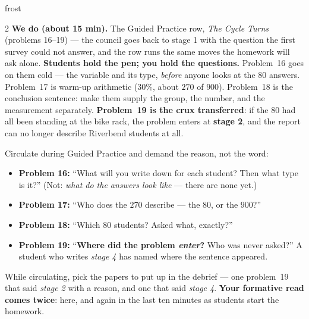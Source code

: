 \documentclass[10pt]{article}
\begin{document}
\begin{skillbox}{frost}
\begin{multicols}{2}
\columnbreak
\textbf{We do (about 15 min).} The Guided Practice row, \emph{The Cycle Turns} (problems
16--19) --- the council goes back to stage 1 with the question the first survey could not
answer, and the row runs the same moves the homework will ask alone.
\textbf{Students hold the pen; you hold the questions.} Problem~16 goes on them cold --- the
variable and its type, \emph{before} anyone looks at the $80$ answers. Problem~17 is warm-up
arithmetic ($30\%$, about $270$ of $900$). Problem~18 is the conclusion sentence: make them
supply the group, the number, and the measurement separately. \textbf{Problem~19 is the crux
transferred}: if the $80$ had all been standing at the bike rack, the problem enters at
\textbf{stage 2}, and the report can no longer describe Riverbend students at all.

Circulate during Guided Practice and demand the reason, not the word:
\begin{itemize}[leftmargin=1.1em, nosep]
  \item \textbf{Problem 16:} ``What will you write down for each student? Then what type is
        it?'' (Not: \emph{what do the answers look like} --- there are none yet.)
  \item \textbf{Problem 17:} ``Who does the $270$ describe --- the $80$, or the $900$?''
  \item \textbf{Problem 18:} ``Which $80$ students? Asked what, exactly?''
  \item \textbf{Problem 19:} ``\textbf{Where did the problem \emph{enter}?} Who was never
        asked?'' A student who writes \emph{stage 4} has named where the sentence appeared.
\end{itemize}
While circulating, pick the papers to put up in the debrief --- one problem~19 that said
\emph{stage 2} with a reason, and one that said \emph{stage 4}. \textbf{Your formative read
comes twice}: here, and again in the last ten minutes as students start the homework.
\end{multicols}
\end{skillbox}
\end{document}
